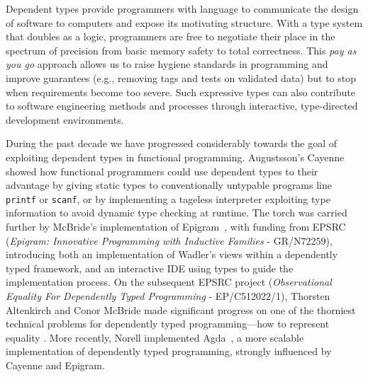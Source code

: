 \documentclass[a4paper]{article}
\begin{document}

Dependent types provide programmers with language to
communicate the design of software to computers
and expose its motivating structure. With a type
system that doubles as a logic,
programmers are free to negotiate their place in the spectrum
of precision from basic memory safety
to total correctness. This \emph{pay as you go} approach allows
us to raise hygiene standards in programming and improve guarantees
(e.g., removing tags and tests on validated data)
but to stop when requirements become too severe.
Such expressive types can also contribute to software engineering
methods and processes through interactive, type-directed development
environments.

During the past decade we have progressed considerably towards the
goal of exploiting dependent types in functional programming.  Augustsson's
Cayenne~\cite{augustsson:cayenne} showed how functional programmers
could use dependent types to their advantage by giving static types to
conventionally untypable programs line \texttt{printf} or
\texttt{scanf}, or by implementing a tageless interpreter exploiting
type information to avoid dynamic type checking at runtime. The torch
was carried further by McBride's implementation of
Epigram~\cite{conor.james:viewfromleft}, with funding from EPSRC
(\textit{Epigram: Innovative Programming with Inductive Families} -
GR/N72259), introducing both an implementation of Wadler's views
\cite{wadler:views}
within a dependently typed framework, and an interactive IDE using
types to guide the implementation process. On the subsequent EPSRC
project (\textit{Observational Equality For Dependently Typed
  Programming} - EP/C512022/1), Thorsten Altenkirch and Conor McBride
made significant progress on one of the thorniest technical problems
for dependently typed programming---how to represent equality \cite{alti:ott-conf}.  More
recently, Norell implemented Agda~\cite{agdawiki,ulf:thesis}, a more
scalable implementation of dependently typed programming, strongly
influenced by Cayenne and Epigram.
\end{document}
